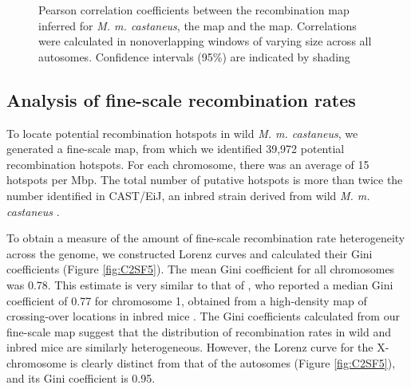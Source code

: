 \linespread{1}
\begin{figure}[h]
   \centering      
   \noindent{}
 \caption[Broad-scale correlations between recombiantion maps for \emph{Mus musculus castaneus} and \emph{Mus musculus domesticus}]{Pearson correlation coefficients between the recombination map inferred for \emph{M. m. castaneus}, the \cite{RN156} map and the \cite{RN232} map. Correlations were calculated in nonoverlapping windows of varying size across all autosomes. Confidence intervals (95\%) are indicated by shading}
\label{fig:C2F3}
\end{figure}
\linespread{2}

\subsection{Analysis of fine-scale recombination rates }

	To locate potential recombination hotspots in wild \textit{M. m. castaneus}, we generated a fine-scale map, from which we identified 39,972 potential recombination hotspots. For each chromosome, there was an average of 15 hotspots per Mbp. The total number of putative hotspots is more than twice the number identified in CAST/EiJ, an inbred strain derived from wild \textit{M. m. castaneus} \citep{RN249}.

	To obtain a measure of the amount of fine-scale recombination rate heterogeneity across the genome, we constructed Lorenz curves and calculated their Gini coefficients (Figure \ref{fig:C2SF5}). The mean Gini coefficient for all chromosomes was 0.78. This estimate is very similar to that of \cite{RN333}, who reported a median Gini coefficient of 0.77 for chromosome 1, obtained from a high-density map of crossing-over locations in inbred mice \citep{RN263}. The Gini coefficients calculated from our fine-scale map suggest that the distribution of recombination rates in wild and inbred mice are similarly heterogeneous. However, the Lorenz curve for the X-chromosome is clearly distinct from that of the autosomes (Figure \ref{fig:C2SF5}), and its Gini coefficient is 0.95. 

